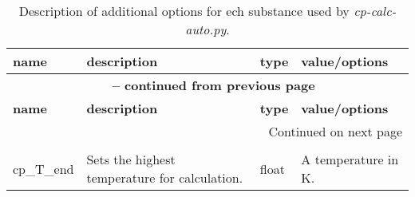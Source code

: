 %
\begin{landscape}
\begin{longtable}{p{4cm}p{5cm}p{2cm}p{8cm}}
	\caption{Description of additional options for ech substance used by \emph{cp-calc-auto.py}.}\label{tbl:cfg-vars_cp-calc-auto_additional}\\
	\textbf{name}	&\textbf{description}	&\textbf{type}	&\textbf{value/options}\\
	\toprule
	\endfirsthead

	\multicolumn{4}{c}{{\bfseries \tablename\ \thetable{} -- continued from previous page}} \\
	\toprule
	\textbf{name}	&\textbf{description}	&\textbf{type}	&\textbf{value/options}\\
	\toprule
	\endhead

	\hline \multicolumn{4}{|r|}{{Continued on next page}} \\ \hline
	\endfoot

	\toprule
	\endlastfoot
	
	\multicolumn{4}{c}{\textbf{$\bm{c_p}$ Algorithm}}\\
	\midrule
	cp\_T\_end	&Sets the highest temperature for calculation.	&float	&A temperature in K.\\
	\bottomrule
\end{longtable}
\end{landscape}
